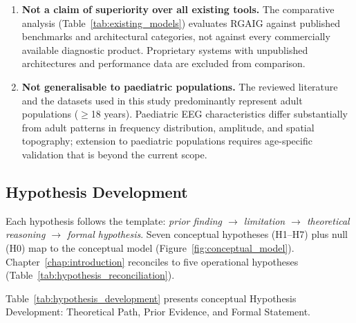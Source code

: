 \begin{enumerate}
    \item \textbf{Not a claim of superiority over all existing tools.} The comparative analysis (Table~\ref{tab:existing_models}) evaluates RGAIG against published benchmarks and architectural categories, not against every commercially available diagnostic product. Proprietary systems with unpublished architectures and performance data are excluded from comparison.
    \item \textbf{Not generalisable to paediatric populations.} The reviewed literature and the datasets used in this study predominantly represent adult populations ($\geq$18 years). Paediatric EEG characteristics differ substantially from adult patterns in frequency distribution, amplitude, and spatial topography; extension to paediatric populations requires age-specific validation that is beyond the current scope.
\end{enumerate}
\fi %

\subsection{Hypothesis Development}

Each hypothesis follows the template: \emph{prior finding $\to$ limitation $\to$ theoretical reasoning $\to$ formal hypothesis}. Seven conceptual hypotheses (H1--H7) plus null (H0) map to the conceptual model (Figure~\ref{fig:conceptual_model}). Chapter~\ref{chap:introduction} reconciles to five operational hypotheses (Table~\ref{tab:hypothesis_reconciliation}).

\noindent Table~\ref{tab:hypothesis_development} presents conceptual Hypothesis Development: Theoretical Path, Prior Evidence, and Formal Statement.

